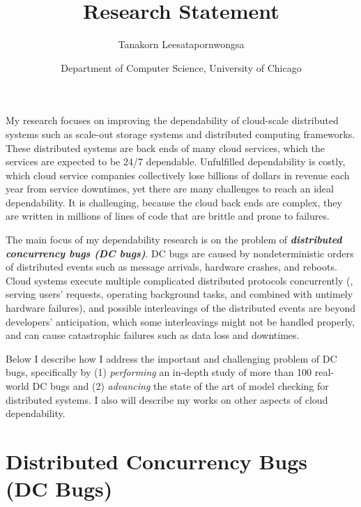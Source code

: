 \documentclass[10pt]{article}
\begin{document}
\title{\textbf{Research Statement}}
\author{Tanakorn Leesatapornwongsa}
\date{\vspace{-1ex} \small{Department of Computer Science, University of
Chicago}}

\maketitle

My research focuses on improving the dependability of cloud-scale distributed
systems such as scale-out storage systems and distributed computing frameworks.
These distributed systems are back ends of many cloud services, which the
services are expected to be 24/7 dependable. Unfulfilled dependability is
costly, which cloud service companies collectively lose billions of dollars in
revenue each year from service downtimes, yet there are many challenges to reach
an ideal dependability. It is challenging, because the cloud back ends are
complex, they are written in millions of lines of code that are brittle and
prone to failures.

The main focus of my dependability research is on the problem of
\textbf{\textit{distributed concurrency bugs (DC bugs)}}. DC bugs are caused by
nondeterministic orders of distributed events such as message arrivals, hardware
crashes, and reboots. Cloud systems execute multiple complicated distributed
protocols concurrently (\eg, serving users' requests, operating background
tasks, and combined with untimely hardware failures), and possible interleavings
of the distributed events are beyond developers' anticipation, which some
interleavings might not be handled properly, and can cause catastrophic failures
such as data loss and downtimes.

Below I describe how I address the important and challenging problem of DC bugs,
specifically by (1) \textit{performing} an in-depth study of more than 100
real-world DC bugs and (2) \textit{advancing} the state of the art of model
checking for distributed systems. I also will describe my works on other aspects
of cloud dependability.

\section{Distributed Concurrency Bugs (DC Bugs)}\label{dcbugs}

\end{document}
